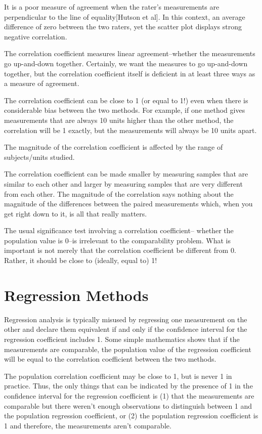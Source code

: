 \documentclass[12pt, a4paper]{report}
\theoremstyle{plain}
\theoremstyle{definition}
\theoremstyle{remark}
\begin{document}
It is a poor measure of agreement when the rater's measurements
are perpendicular to the line of equality[Hutson et al]. In this
context, an average difference of zero between the two raters, yet
the scatter plot displays strong negative correlation.
	

The correlation coefficient measures linear agreement--whether the measurements go up-and-down together. Certainly, we want the measures to go up-and-down together, but the correlation coefficient itself is deficient in at least three ways as a measure of agreement.

The correlation coefficient can be close to 1 (or equal to 1!) even when there is considerable bias between the two methods. For example, if one method gives measurements that are always 10 units higher than the other method, the correlation will be 1 exactly, but the measurements will always be 10 units apart.

The magnitude of the correlation coefficient is affected by the range of subjects/units studied. 

The correlation coefficient can be made smaller by measuring samples that are similar to each other and larger by measuring samples that are very different from each other. The magnitude of the correlation says nothing about the magnitude of the differences between the paired measurements which, when you get right down to it, is all that really matters.

The usual significance test involving a correlation coefficient-- whether the population value is 0--is irrelevant to the comparability problem. What is important is not merely that the correlation coefficient be different from 0. Rather, it should be close to (ideally, equal to) 1!
	




	\section*{Regression Methods}
 Regression analysis is typically misused by regressing one measurement on the other and declare them equivalent if and only if the confidence interval for the regression coefficient includes 1. Some simple mathematics shows that if the measurements are comparable, the population value of the regression coefficient will be equal to the correlation coefficient between the two methods. 
 
The population correlation coefficient may be close to 1, but is never 1 in practice. Thus, the only things that can be indicated by the presence of 1 in the confidence interval for the regression coefficient is (1) that the measurements are comparable but there weren't enough observations to distinguish between 1 and the population regression coefficient, or (2) the population regression coefficient is 1 and therefore, the measurements aren't comparable.
		
\end{document}

